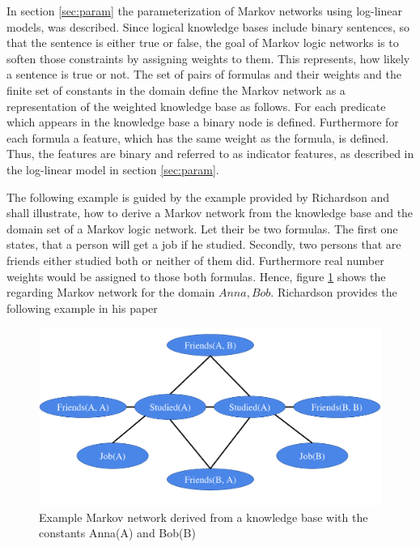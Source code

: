 In section \ref{sec:param} the parameterization of Markov networks using log-linear models, was described. Since logical knowledge bases include binary sentences, so that the sentence is either true or false, the goal of Markov logic networks is to soften those constraints by assigning weights to them. This represents, how likely a sentence is true or not. The set of pairs of formulas and their weights and the finite set of constants in the domain define the Markov network as a representation of the weighted knowledge base as follows. For each predicate which appears in the knowledge base a binary node is defined. Furthermore for each formula a feature, which has the same weight as the formula, is defined. Thus, the features are binary and referred to as indicator features, as described in the log-linear model in section \ref{sec:param}.

The following example is guided by the example provided by Richardson \cite{richardson2006markov} and shall illustrate, how to derive a Markov network from the knowledge base and the domain set of a Markov logic network. Let their be two formulas. The first one states, that a person will get a job if he studied. Secondly, two persons that are friends either studied both or neither of them did. Furthermore real number weights would be assigned to those both formulas. Hence, figure \ref{fig:mln} shows the regarding Markov network for the domain ${Anna,Bob}$.
Richardson provides the following example in his paper \cite{richardson2006markov}

\begin{figure}[htpb]
  \centering
  	\includegraphics[scale=0.6]{img/mln.pdf} 
  \caption{Example Markov network derived from a knowledge base with the constants Anna(A) and Bob(B)}
  \label{fig:mln}
\end{figure}

